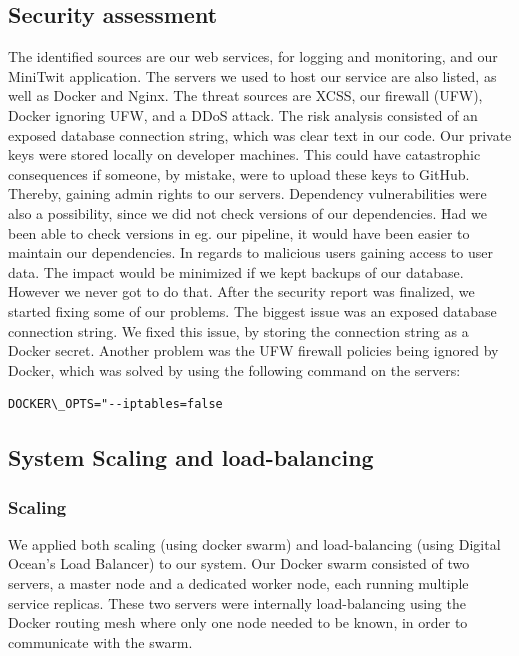 \subsection{Security assessment}
The identified sources are our web services, for logging and monitoring, and our MiniTwit application.
The servers we used to host our service are also listed, as well as Docker and Nginx.
The threat sources are XCSS, our firewall (UFW), Docker ignoring UFW, and a DDoS attack.
The risk analysis consisted of an exposed database connection string, which was clear text in our code.
Our private keys were stored locally on developer machines. 
This could have catastrophic consequences if someone, by mistake, were to upload these keys to GitHub. Thereby, gaining admin rights to our servers.
Dependency vulnerabilities were also a possibility, since we did not check versions of our dependencies. 
Had we been able to check versions in eg. our pipeline, it would have been easier to maintain our dependencies.
In regards to malicious users gaining access to user data. The impact would be minimized if we kept backups of our database. However we never got to do that.
After the security report was finalized, we started fixing some of our problems. 
The biggest issue was an exposed database connection string. We fixed this issue, by storing the connection string as a Docker secret.
Another problem was the UFW firewall policies being ignored by Docker, which was solved by using the following command on the servers: 
\begin{verbatim}
DOCKER\_OPTS="--iptables=false
\end{verbatim}

\subsection{System Scaling and load-balancing}
\subsubsection{Scaling}
We applied both scaling (using docker swarm) and load-balancing (using Digital Ocean's Load Balancer) to our system. 
Our Docker swarm consisted of two servers, a master node and a dedicated worker node, each running multiple service replicas. 
These two servers were internally load-balancing using the Docker routing mesh where only one node needed to be known, in order to communicate with the swarm.

